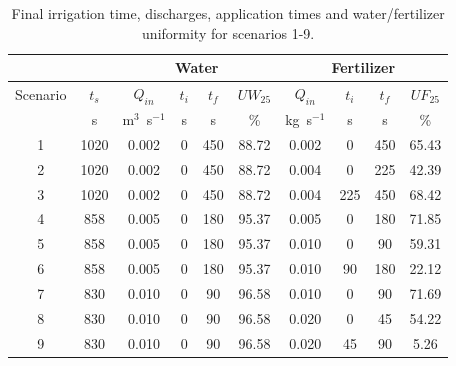 \documentclass[review,authoryear]{elsarticle}
\begin{document}
\begin{table}[ht!]
\centering
\caption{Final irrigation time, discharges, application times and
water/fertilizer uniformity for scenarios 1-9.\label{TabFurrow}}
\footnotesize
\begin{tabular}{|c|c|cccc|cccc|}
\hline
&&\multicolumn{4}{|c|}{Water}&\multicolumn{4}{|c|}{Fertilizer}\\
\hline
Scenario&$t_s$&$Q_{in}$&$t_i$&$t_f$&$UW_{25}$&$Q_{in}$&$t_i$&$t_f$&$UF_{25}$\\
&s&m$^3$~s$^{-1}$&s&s&\%&kg~s$^{-1}$&s&s&\%\\
\hline
1&1020&0.002&0&450&88.72&0.002&0&450&65.43\\
2&1020&0.002&0&450&88.72&0.004&0&225&42.39\\
3&1020&0.002&0&450&88.72&0.004&225&450&68.42\\
4&858&0.005&0&180&95.37&0.005&0&180&71.85\\
5&858&0.005&0&180&95.37&0.010&0&90&59.31\\
6&858&0.005&0&180&95.37&0.010&90&180&22.12\\
7&830&0.010&0&90&96.58&0.010&0&90&71.69\\
8&830&0.010&0&90&96.58&0.020&0&45&54.22\\
9&830&0.010&0&90&96.58&0.020&45&90&5.26\\
\hline
\end{tabular}
\end{table}
\end{document}
